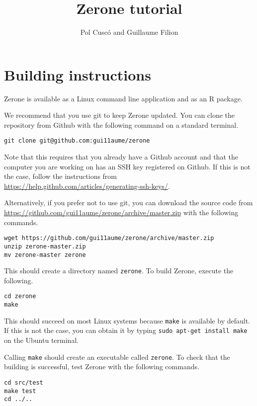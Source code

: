 \documentclass[12pt]{article}
\title{Zerone tutorial}
\author{Pol Cusc\'o and Guillaume Filion}
\begin{document}
\maketitle

\section{Building instructions}

Zerone is available as a Linux command line application and as an R package.

We recommend that you use git to keep Zerone updated. You can clone the
repository from Github with the following command on a standard terminal.

\begin{verbatim}
git clone git@github.com:gui11aume/zerone
\end{verbatim}

Note that this requires that you already have a Github account
and that the computer you are working on has an SSH key registered
on Github. If this is not the case, follow the instructions from
\url{https://help.github.com/articles/generating-ssh-keys/}.

Alternatively, if you prefer not to use git, you can download the source code
from \url{https://github.com/gui11aume/zerone/archive/master.zip} with the
following commands.

\begin{verbatim}
wget https://github.com/gui11aume/zerone/archive/master.zip
unzip zerone-master.zip
mv zerone-master zerone
\end{verbatim}

This should create a directory named \texttt{zerone}. To build Zerone,
execute the following.

\begin{verbatim}
cd zerone
make
\end{verbatim}

This should succeed on most Linux systems because \texttt{make} is
available by default. If this is not the case, you can obtain it by
typing \texttt{sudo apt-get install make} on the Ubuntu terminal.

Calling \texttt{make} should create an executable called
\texttt{zerone}. To check that the building is successful, test Zerone with
the following commands.

\begin{verbatim}
cd src/test
make test
cd ../..
\end{verbatim}
\end{document}
